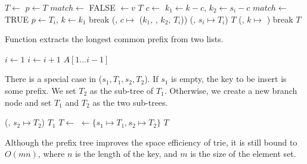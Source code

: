 \documentclass[b5paper]{article}
\begin{document}
\begin{algorithmic}[1]
   \State $T \gets$ 
  \EndIf
  \State $p \gets T$
  \Loop
    \State $match \gets$ FALSE
        \State {} $\gets v$ 
        \State \Return $T$
      \EndIf
      \State $c \gets$ 
      \State $k_1 \gets k - c$, $k_2 \gets s_i - c$
        \State $match \gets$ TRUE
         
          \State $p \gets T_i$, $k \gets k_1$
          \State break
        \Else {}
          \State {}(, $c \mapsto$ ($k_1$, , $k_2$, $T_i$))
          \State {}(, $s_i \mapsto T_i$)
          \State \Return $T$
        \EndIf
      \EndIf
    \EndFor
     
      \State {}(, $k \mapsto$ )
      \State break
    \EndIf
  \EndLoop
  \State \Return $T$
\EndFunction
\end{algorithmic}

Function  extracts the longest common prefix from two lists.

\begin{algorithmic}[1]
  \State $i \gets 1 $
    \State $i \gets i + 1$
  \EndWhile
  \State \Return $A[1...i-1]$
\EndFunction
\end{algorithmic}

There is a special case in ($s_1, T_1, s_2, T_2$). If $s_1$ is empty, the key to be insert is some prefix. We set $T_2$ as the sub-tree of $T_1$. Otherwise, we create a new branch node and set $T_1$ and $T_2$ as the two sub-trees.

\begin{algorithmic}[1]
    \State {}(, $s_2 \mapsto T_2$)
    \State \Return $T_1$
  \EndIf
  \State $T \gets$ 
  \State {} $\gets \{s_1 \mapsto T_1, s_2 \mapsto T_2\}$
  \State \Return $T$
\EndFunction
\end{algorithmic}

Although the prefix tree improves the space efficiency of trie, it is still bound to $O(m n)$, where $n$ is the length of the key, and $m$ is the size of the element set.
\end{document}
